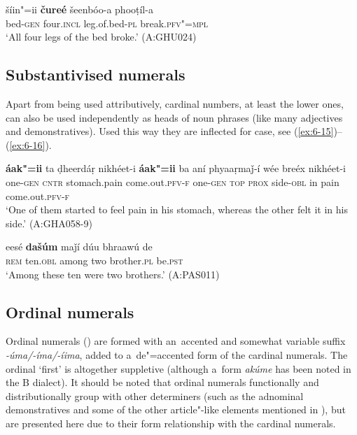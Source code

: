 \begin{exe}
\ex
\label{ex:6-14}
\gll šíin"=ii \textbf{čureé} šeenbóo-a phooṭíl-a \\
bed-\textsc{gen} four.\textsc{incl} leg.of.bed-\textsc{pl} break.\textsc{pfv"=mpl} \\
\glt `All four legs of the bed broke.' (A:GHU024)
\end{exe}

\subsection{Substantivised numerals}
\label{subsec:6-4-2}


Apart from being used attributively, cardinal numbers, at least the lower ones, can also be used independently as heads of noun phrases (like many adjectives and demonstratives). Used this way they are inflected for case, see (\ref{ex:6-15})--(\ref{ex:6-16}).

\begin{exe}
\ex
\label{ex:6-15}
\gll \textbf{áak"=ii} ta ḍheerdáṛ nikhéet-i \textbf{áak"=ii} ba  aní phyaaṛmaǰ-í wée
breéx nikhéet-i \\
one-\textsc{gen} \textsc{cntr} stomach.pain come.out.\textsc{pfv-f} one-\textsc{gen} \textsc{top} \textsc{prox} side-\textsc{obl} in pain come.out.\textsc{pfv-f} \\
\glt `One of them started to feel pain in his stomach, whereas the other felt it in his side.'
(A:GHA058-9)

\ex
\label{ex:6-16}
\gll eesé \textbf{dašúm} maǰí dúu bhraawú de  \\
\textsc{rem} ten.\textsc{obl} among two brother.\textsc{pl} be.\textsc{pst}  \\
\glt `Among these ten were two brothers.' (A:PAS011)
\end{exe}

\subsection{Ordinal numerals}
\label{subsec:6-4-3}

Ordinal numerals () are formed with an~accented and somewhat variable suffix \textit{-úma/-íma/-íima}, added to a~de"=accented form of the cardinal numerals. The ordinal `first' is altogether suppletive (although a~form \textit{akúme} has been noted in the B dialect). It should be noted that ordinal numerals functionally and distributionally group with other determiners (such as the adnominal demonstratives and some of the other article"-like elements mentioned in ), but are presented here due to their form relationship with the cardinal numerals.




